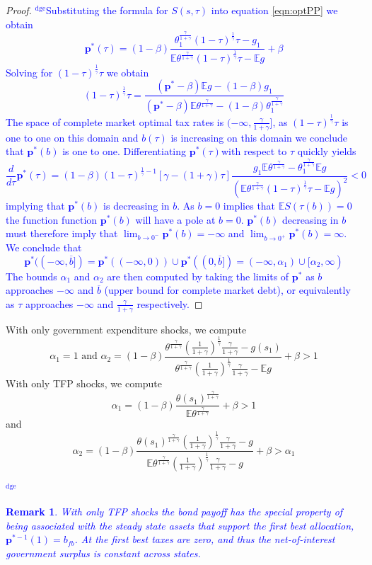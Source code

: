 \documentclass[12pt]{article}
\newcommand{\dge}[1]{\textcolor{blue}{$^{\textrm{dge}}${#1}}}
\newcommand{\EE}{\mathbb E}
\newtheorem{remark}[theorem]{Remark}
\begin{document}
\begin{proof}
\dge{Substituting the formula for $S(s,\tau)$ into equation \eqref{eqn:optPP} we obtain
\[
	\bm p^*(\tau) = (1-\beta)\frac{\theta_1^\frac\gamma{1+\gamma}(1-\tau)^\frac1\gamma\tau-g_1}{\EE\theta^\frac\gamma{1+\gamma}(1-\tau)^\frac1\gamma\tau - \EE g} + \beta
\]  Solving for $(1-\tau)^\frac1\gamma\tau$ we obtain
\[
	(1-\tau)^\frac{1}{\gamma}\tau = \frac{(\bm p^*-\beta)\EE g-(1-\beta)g_1}{(\bm p^* - \beta)\EE\theta^\frac{\gamma}{1+\gamma}-(1-\beta)\theta_1^\frac{\gamma}{1+\gamma}}
\]  The space of complete market optimal tax rates is $(-\infty,\frac\gamma{1+\gamma}]$, as $(1-\tau)^\frac1\gamma\tau$ is one to one on this domain and $b(\tau)$ is increasing on this domain we conclude that $\bm p^*(b)$ is one to one. Differentiating $\bm p^*(\tau)$with respect to $\tau$ quickly yields
\[ 
	\frac{d}{d\tau} \bm p^*(\tau) = (1-\beta)(1-\tau)^{\frac1\gamma-1}\left[\gamma-(1+\gamma)\tau\right]\frac{g_1\EE\theta^\frac{\gamma}{1+\gamma}-\theta_1^\frac\gamma{1+\gamma}\EE g }{(\EE\theta^\frac\gamma{1+\gamma}(1-\tau)^\frac1\gamma\tau-\EE g)^2} <0
\] implying that $\bm p^*(b)$ is decreasing in $b$.  As $b =0$ implies that $\EE S(\tau(b)) =0$ the function function $\bm p^*(b)$ will have a pole at $b = 0$.  $\bm p^*(b)$ decreasing in $b$ must therefore imply that $\lim_{b\rightarrow0^{-} } \bm p^*(b) = -\infty$ and $\lim_{b\rightarrow 0^+} \bm p^*(b) = \infty$.  We conclude that 
\[
	\bm p^*((-\infty,\overline b]) = \bm p^*((-\infty,0))\cup \bm p^*((0,\overline b]) = (-\infty,\alpha_1)\cup[\alpha_2,\infty)
\]The bounds $\alpha_1$ and $\alpha_2$ are then computed by taking the limits of $\bm p^*$ as $b$ approaches $-\infty$ and $\overline b$ (upper bound for complete market debt), or equivalently as $\tau$ approaches $-\infty$ and $\frac\gamma{1+\gamma}$ respectively.}
\end{proof}
 With only government expenditure shocks, we compute
		\[
			\alpha_1 = 1 \text{  and }  \alpha_2 = (1-\beta)\frac{\theta^\frac{\gamma}{1+\gamma}\left(\frac{1}{1+\gamma}\right)^\frac1\gamma\frac{\gamma}{1+\gamma}-g(s_1)}{\theta^\frac{\gamma}{1+\gamma}\left(\frac{1}{1+\gamma}\right)^\frac1\gamma\frac{\gamma}{1+\gamma}-\EE g} +\beta>1
		\]
		With only TFP shocks, we compute
		\[
			\alpha_1 = (1-\beta)\frac{\theta(s_1)^\frac{\gamma}{1+\gamma}}{\EE\theta^\frac{\gamma}{1+\gamma}}+\beta > 1
		\]and
		\[
		\alpha_2 = (1-\beta)\frac{\theta(s_1)^\frac{\gamma}{1+\gamma}\left(\frac{1}{1+\gamma}\right)^\frac1\gamma\frac{\gamma}{1+\gamma}-g}{\EE\theta^\frac{\gamma}{1+\gamma}\left(\frac{1}{1+\gamma}\right)^\frac1\gamma\frac{\gamma}{1+\gamma}-g}+\beta>\alpha_1
		\]\dge{\begin{remark}
		With only TFP shocks the bond payoff has the special property of being associated with the steady state assets that support the first best allocation, $\bm p^{* -1}(1) = b_{fb}$.  At the first best taxes are zero, and thus the net-of-interest government surplus is constant across states.
		\end{remark}}
\end{document}
